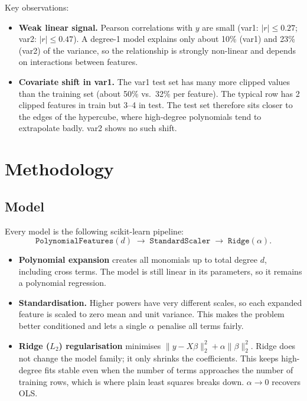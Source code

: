 \documentclass[11pt,a4paper]{article}
\begin{document}
Key observations:
\begin{itemize}
  \item \textbf{Weak linear signal.} Pearson correlations with $y$ are small
        (var1: $|r|\le0.27$; var2: $|r|\le0.47$). A degree-1 model explains only
        about 10\% (var1) and 23\% (var2) of the variance, so the relationship is
        strongly non-linear and depends on interactions between features.
  \item \textbf{Covariate shift in var1.} The var1 test set has many more clipped
        values than the training set (about 50\% vs.\ 32\% per feature). The typical
        row has 2 clipped features in train but 3--4 in test. The test set therefore
        sits closer to the edges of the hypercube, where high-degree polynomials
        tend to extrapolate badly. var2 shows no such shift.
\end{itemize}

\section{Methodology}

\subsection{Model}
Every model is the following scikit-learn pipeline:
\[
\texttt{PolynomialFeatures}(d) \;\rightarrow\; \texttt{StandardScaler} \;\rightarrow\; \texttt{Ridge}(\alpha).
\]
\begin{itemize}
  \item \textbf{Polynomial expansion} creates all monomials up to total degree $d$,
        including cross terms. The model is still linear in its parameters, so it
        remains a polynomial regression.
  \item \textbf{Standardisation.} Higher powers have very different scales, so each
        expanded feature is scaled to zero mean and unit variance. This makes the
        problem better conditioned and lets a single $\alpha$ penalise all terms
        fairly.
  \item \textbf{Ridge ($L_2$) regularisation} minimises
        $\|y - X\beta\|_2^2 + \alpha\|\beta\|_2^2$. Ridge does not change the model
        family; it only shrinks the coefficients. This keeps high-degree fits stable
        even when the number of terms approaches the number of training rows, which
        is where plain least squares breaks down. $\alpha \to 0$ recovers OLS.
\end{itemize}
\end{document}
